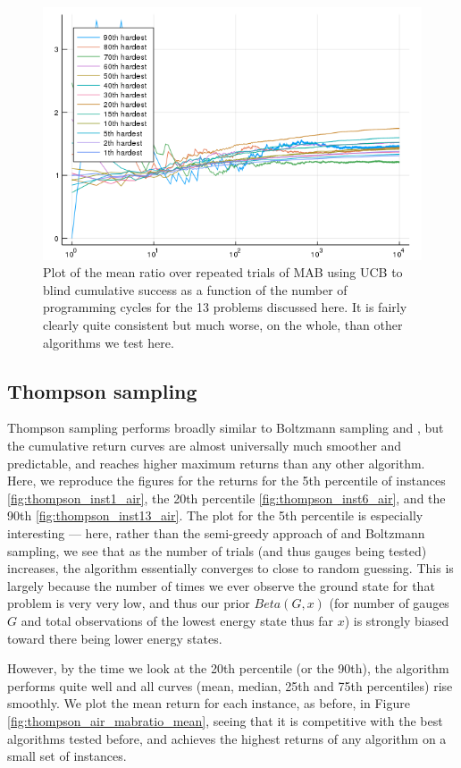 \begin{figure}
    \includegraphics[width=0.8\columnwidth]{ucb_air_mabratio_mean.png}
    \caption{Plot of the mean ratio over repeated trials of MAB using UCB to blind cumulative success as a function of the number of programming cycles for the 13 problems discussed here. It is fairly clearly quite consistent but much worse, on the whole, than other algorithms we test here.}
    \label{fig:ucb_air_mabratio_mean}
\end{figure}

\subsection{Thompson sampling}

Thompson sampling performs broadly similar to Boltzmann sampling and \eg, but the cumulative return curves are almost universally much smoother and predictable, and reaches higher maximum returns than any other algorithm. Here, we reproduce the figures for the returns for the 5th percentile of instances \ref{fig:thompson_inst1_air}, the 20th percentile \ref{fig:thompson_inst6_air}, and the 90th \ref{fig:thompson_inst13_air}. The plot for the 5th percentile is especially interesting --- here, rather than the semi-greedy approach of \eg and Boltzmann sampling, we see that as the number of trials (and thus gauges being tested) increases, the algorithm essentially converges to close to random guessing. This is largely because the number of times we ever observe the ground state for that problem is very very low, and thus our prior $Beta(G,x)$ (for number of gauges $G$ and total observations of the lowest energy state thus far $x$) is strongly biased toward there being lower energy states.

However, by the time we look at the 20th percentile (or the 90th), the algorithm performs quite well and all curves (mean, median, 25th and 75th percentiles) rise smoothly. We plot the mean return for each instance, as before, in Figure \ref{fig:thompson_air_mabratio_mean}, seeing that it is competitive with the best algorithms tested before, and achieves the highest returns of any algorithm on a small set of instances.

